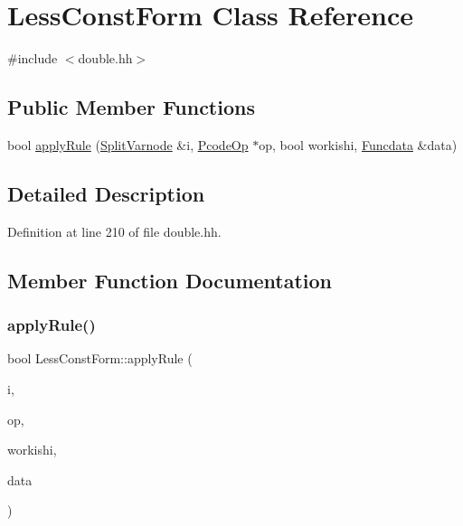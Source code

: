 \hypertarget{class_less_const_form}{}\section{Less\+Const\+Form Class Reference}
\label{class_less_const_form}


{\ttfamily \#include $<$double.\+hh$>$}

\subsection*{Public Member Functions}
\begin{DoxyCompactItemize}
\item 
bool \mbox{\hyperlink{class_less_const_form_a9cbb914fa234280574f936cb6a662fc4}{apply\+Rule}} (\mbox{\hyperlink{class_split_varnode}{Split\+Varnode}} \&i, \mbox{\hyperlink{class_pcode_op}{Pcode\+Op}} $\ast$op, bool workishi, \mbox{\hyperlink{class_funcdata}{Funcdata}} \&data)
\end{DoxyCompactItemize}


\subsection{Detailed Description}


Definition at line 210 of file double.\+hh.



\subsection{Member Function Documentation}
\mbox{\label{class_less_const_form_a9cbb914fa234280574f936cb6a662fc4}} 
\subsubsection{\texorpdfstring{applyRule()}{applyRule()}}
{\footnotesize\ttfamily bool Less\+Const\+Form\+::apply\+Rule (\begin{DoxyParamCaption}\item[{\mbox{\hyperlink{class_split_varnode}{Split\+Varnode}} \&}]{i,  }\item[{\mbox{\hyperlink{class_pcode_op}{Pcode\+Op}} $\ast$}]{op,  }\item[{bool}]{workishi,  }\item[{\mbox{\hyperlink{class_funcdata}{Funcdata}} \&}]{data }\end{DoxyParamCaption})}



